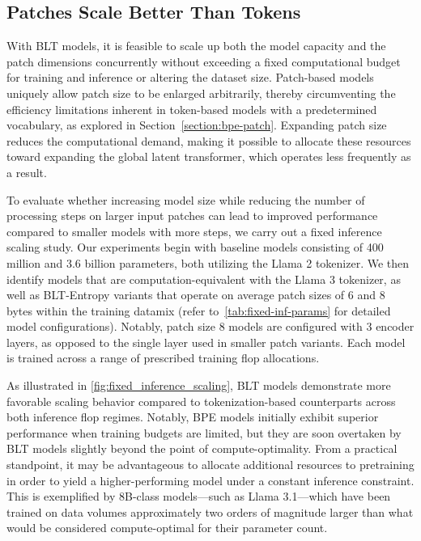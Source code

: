 \subsection{Patches Scale Better Than Tokens} With {\textsc BLT} models, it is feasible to scale up both the model capacity and the patch dimensions concurrently without exceeding a fixed computational budget for training and inference or altering the dataset size. Patch-based models uniquely allow patch size to be enlarged arbitrarily, thereby circumventing the efficiency limitations inherent in token-based models with a predetermined vocabulary, as explored in Section~\ref{section:bpe-patch}. Expanding patch size reduces the computational demand, making it possible to allocate these resources toward expanding the global latent transformer, which operates less frequently as a result.

To evaluate whether increasing model size while reducing the number of processing steps on larger input patches can lead to improved performance compared to smaller models with more steps, we carry out a fixed inference scaling study. Our experiments begin with baseline models consisting of 400 million and 3.6 billion parameters, both utilizing the Llama 2 tokenizer. We then identify models that are computation-equivalent with the Llama 3 tokenizer, as well as {\textsc BLT}-Entropy variants that operate on average patch sizes of 6 and 8 bytes within the training datamix (refer to~\autoref{tab:fixed-inf-params} for detailed model configurations). Notably, patch size 8 models are configured with 3 encoder layers, as opposed to the single layer used in smaller patch variants. Each model is trained across a range of prescribed training flop allocations.

As illustrated in \autoref{fig:fixed_inference_scaling}, {\textsc BLT} models demonstrate more favorable scaling behavior compared to tokenization-based counterparts across both inference flop regimes. Notably, BPE models initially exhibit superior performance when training budgets are limited, but they are soon overtaken by {\textsc BLT} models slightly beyond the point of compute-optimality. From a practical standpoint, it may be advantageous to allocate additional resources to pretraining in order to yield a higher-performing model under a constant inference constraint. This is exemplified by 8B-class models—such as Llama 3.1—which have been trained on data volumes approximately two orders of magnitude larger than what would be considered compute-optimal for their parameter count.

